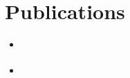 \chapter{Publications} 

\begin{itemize}
  \item \cite{ManulisSKD15a} 
  \item \cite{KieferM14b} 
\end{itemize}
